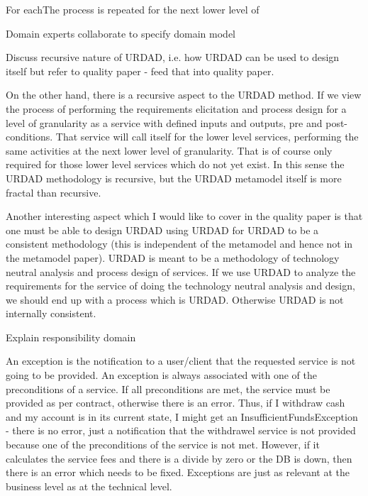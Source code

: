 For eachThe process is repeated for the next lower level of

Domain experts collaborate to specify domain model

Discuss recursive nature of URDAD, i.e. how URDAD can be used to design itself but refer to quality paper - feed that into quality paper.

On the other hand, there is a recursive aspect to the URDAD method. If
we view the process of performing the requirements elicitation and
process design for  a level of granularity as a service with defined
inputs and outputs, pre and post-conditions. That service will call
itself for the lower level services, performing the same activities at
the next lower level of granularity. That is of course only required for
those lower level services which do not yet exist. In this sense the
URDAD methodology is recursive, but the URDAD metamodel itself is more
fractal than recursive.

Another interesting aspect which I would like to cover in the quality
paper is that one must be able to design URDAD using URDAD for URDAD to
be a consistent methodology (this is independent of the metamodel and
hence not in the metamodel paper). URDAD is meant to be a methodology of
technology neutral analysis and process design of services. If we use
URDAD to analyze the requirements for the service of doing the
technology neutral analysis and design, we should end up with a process
which is URDAD. Otherwise URDAD is not internally consistent.


Explain responsibility domain

An exception is the notification to a user/client that the requested service is not going to be provided. An exception is always associated with one of the preconditions of a service. If all preconditions are met, the service must be provided as per contract, otherwise there is an error. Thus, if I withdraw cash and my account is in its current state, I might get an InsufficientFundsException - there is no error, just a notification that the withdrawel service is not provided because one of the preconditions of the service is not met. However, if it calculates the service fees and there is a divide by zero or the DB is down, then there is an error which needs to be fixed. Exceptions are just as relevant at the business level as at the technical level.





